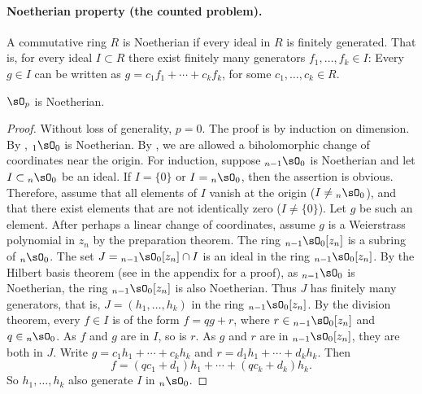 \paragraph{Noetherian property (the counted problem).}
A commutative ring $R$ is Noetherian if every ideal in $R$ is finitely generated. That is, for every ideal $I\subset R$ there exist finitely many generators $f_1,\ldots,f_k\in I$: Every $g\in I$ can be written as $g=c_1f_1+\cdots+c_kf_k$, for some $c_1,\ldots,c_k\in R$.
\begin{thm}
$\sO_p$ is Noetherian.
\end{thm}
\begin{proof}
Without loss of generality, $p=0$. The proof is by induction on dimension. By , ${}_1\sO_0$ is Noetherian. By , we are allowed a biholomorphic change of coordinates near the origin. For induction, suppose ${}_{n-1}\sO_0$ is Noetherian and let $I\subset{}_n\sO_0$ be an ideal. If $I=\{0\}$ or $I={}_n\sO_0$, then the assertion is obvious. Therefore, assume that all elements of $I$ vanish at the origin ($I\neq{}_n\sO_0$), and that there exist elements that are not identically zero ($I\neq\{0\}$). Let $g$ be such an element. After perhaps a linear change of coordinates, assume $g$ is a Weierstrass polynomial in $z_n$ by the preparation theorem. The ring ${}_{n-1}\sO_0[z_n]$ is a subring of ${}_n\sO_0$. The set $J={}_{n-1}\sO_0[z_n]\cap I$ is an ideal in the ring ${}_{n-1}\sO_0[z_n]$. By the Hilbert basis theorem (see  in the appendix for a proof), as ${}_{n-1}\sO_0$ is Noetherian, the ring ${}_{n-1}\sO_0[z_n]$ is also Noetherian. Thus $J$ has finitely many generators, that is, $J=(h_1,\ldots,h_k)$ in the ring ${}_{n-1}\sO_0[z_n]$. By the division theorem, every $f\in I$ is of the form $f=qg+r$, where $r\in{}_{n-1}\sO_0[z_n]$ and $q\in{}_n\sO_0$. As $f$ and $g$ are in $I$, so is $r$. As $g$ and $r$ are in ${}_{n-1}\sO_0[z_n]$, they are both in $J$. Write $g=c_1h_1+\cdots+c_kh_k$ and $r=d_1h_1+\cdots+d_kh_k$. Then
\[f=(qc_1+d_1)h_1+\cdots+(qc_k+d_k)h_k.\]
So $h_1,\ldots,h_k$ also generate $I$ in ${}_n\sO_0$.
\end{proof}
